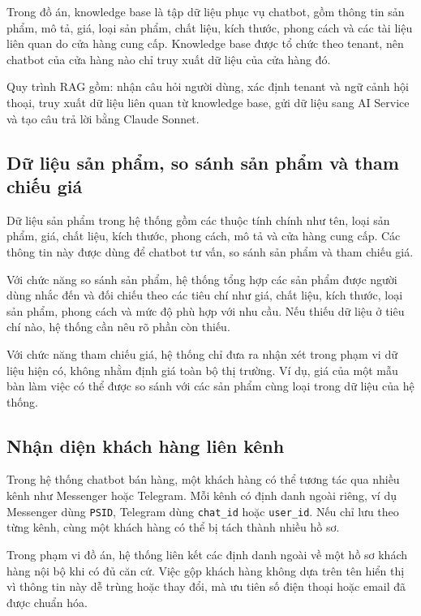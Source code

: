 \documentclass[../DoAn.tex]{subfiles}
\begin{document}
Trong đồ án, knowledge base là tập dữ liệu phục vụ chatbot, gồm thông tin sản phẩm, mô tả, giá, loại sản phẩm, chất liệu, kích thước, phong cách và các tài liệu liên quan do cửa hàng cung cấp. Knowledge base được tổ chức theo tenant, nên chatbot của cửa hàng nào chỉ truy xuất dữ liệu của cửa hàng đó.

Quy trình RAG gồm: nhận câu hỏi người dùng, xác định tenant và ngữ cảnh hội thoại, truy xuất dữ liệu liên quan từ knowledge base, gửi dữ liệu sang AI Service và tạo câu trả lời bằng Claude Sonnet.

\subsection{Dữ liệu sản phẩm, so sánh sản phẩm và tham chiếu giá}
\label{subsection:3.1.3}

Dữ liệu sản phẩm trong hệ thống gồm các thuộc tính chính như tên, loại sản phẩm, giá, chất liệu, kích thước, phong cách, mô tả và cửa hàng cung cấp. Các thông tin này được dùng để chatbot tư vấn, so sánh sản phẩm và tham chiếu giá.

Với chức năng so sánh sản phẩm, hệ thống tổng hợp các sản phẩm được người dùng nhắc đến và đối chiếu theo các tiêu chí như giá, chất liệu, kích thước, loại sản phẩm, phong cách và mức độ phù hợp với nhu cầu. Nếu thiếu dữ liệu ở tiêu chí nào, hệ thống cần nêu rõ phần còn thiếu.

Với chức năng tham chiếu giá, hệ thống chỉ đưa ra nhận xét trong phạm vi dữ liệu hiện có, không nhằm định giá toàn bộ thị trường. Ví dụ, giá của một mẫu bàn làm việc có thể được so sánh với các sản phẩm cùng loại trong dữ liệu của hệ thống.

\subsection{Nhận diện khách hàng liên kênh}
\label{subsection:3.1.4}

Trong hệ thống chatbot bán hàng, một khách hàng có thể tương tác qua nhiều kênh như Messenger hoặc Telegram. Mỗi kênh có định danh ngoài riêng, ví dụ Messenger dùng \texttt{PSID}, Telegram dùng \texttt{chat\_id} hoặc \texttt{user\_id}. Nếu chỉ lưu theo từng kênh, cùng một khách hàng có thể bị tách thành nhiều hồ sơ.

Trong phạm vi đồ án, hệ thống liên kết các định danh ngoài về một hồ sơ khách hàng nội bộ khi có đủ căn cứ. Việc gộp khách hàng không dựa trên tên hiển thị vì thông tin này dễ trùng hoặc thay đổi, mà ưu tiên số điện thoại hoặc email đã được chuẩn hóa.
\end{document}
